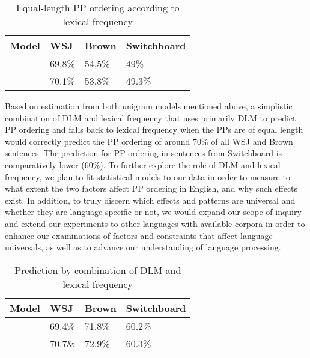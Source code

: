 \documentclass[11pt,letterpaper]{article}
\begin{document}
\begin{table}[h!]
\small
\centering
				\begin{tabular}{|p{2cm}|p{1cm}|p{1cm}|p{2cm}|}
		\hline
	Model &	WSJ & Brown & Switchboard \\ \hline
	& 69.8\% & 54.5\% & 49\% \\
	& 70.1\% & 53.8\% & 49.3\% \\
	\hline
				\end{tabular}	
		\caption{ Equal-length PP ordering according to lexical frequency}
		\end{table}
		
 Based on estimation from both unigram models mentioned above, a simplistic combination of DLM and lexical frequency that uses primarily DLM to predict PP ordering and falls back to lexical frequency when the PPs are of equal length would correctly predict the PP ordering of around 70\% of all WSJ and Brown sentences. The prediction for PP ordering in sentences from Switchboard is comparatively lower (60\%). To further explore the role of DLM and lexical frequency, we plan to fit statistical models to our data in order to measure to what extent the two factors affect PP ordering in English, and why such effects exist. In addition, to truly discern which effects and patterns are universal and whether they are language-specific or not, we would expand our scope of inquiry and extend our experiments to other languages with available corpora in order to enhance our examinations of factors and constraints that affect language universals, as well as to advance our understanding of language processing.
 
\begin{table}[h!]
\small
\centering
				\begin{tabular}{|p{1cm}|p{1cm}|p{2cm}|p{2cm}|}
		\hline
	Model &	WSJ & Brown & Switchboard \\ \hline
	& 69.4\% & 71.8\% & 60.2\% \\
	& 70.7\& & 72.9\% & 60.3\% \\ 
	\hline
				\end{tabular}	
		\caption{Prediction by combination of DLM and lexical frequency}
		\end{table}




\end{document}
